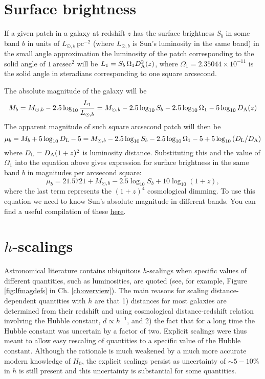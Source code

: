 \section{Surface brightness}
\label{sec:surface_brightness}
If a given patch in a galaxy at redshift $z$ has the surface brightness $S_b$ in some band $b$ in units of $L_{\odot,b}\,\mathrm{pc}^{-2}$ (where $L_{\odot,b}$ is Sun's luminosity in the same band) in the small angle approximation the luminosity of the patch corresponding to the solid angle of $1\ \mathrm{arcsec}^2$ will be $L_1=S_b\,\Omega_1 D_{\rm A}^2(z)$, where $\Omega_1=2.35044\times 10^{-11}$ is the solid angle in steradians corresponding to one square arcsecond. 

The absolute magnitude of the galaxy will be 
\begin{equation}
M_b=M_{\odot,b}-2.5\log_{10}\frac{L_1}{L_{\odot,b}}=M_{\odot,b}-2.5\log_{10}S_b-2.5\log_{10}\Omega_1-5\log_{10}D_{\rm A}(z)
\end{equation}
The apparent magnitude of such square arcsecond patch will then be
\begin{equation}
\mu_b = M_b+5\log_{10}D_{\rm L} - 5=
M_{\odot,b}-2.5\log_{10}S_b-2.5\log_{10}\Omega_1-5+5\log_{10}\left(D_{\rm L}/D_{\rm A}
\right)
\end{equation}
where $D_{\rm L}=D_{\rm A}(1+z)^2$  is luminosity distance. Substituting this and the value of $\Omega_1$ into the equation above gives expression for surface brightness in the same band $b$ in magnitudes per arcsecond square:
\begin{equation}
\mu_b = 21.5721 + M_{\odot,b}-2.5\log_{10}S_b+10\log_{10}(1+z),
\label{eq:musb}
\end{equation}
where the last term represents the $(1+z)^4$ cosmological dimming. To use this equation we need to know Sun's absolute magnitude in different bands. You can find a useful compilation of these \underline{\href{http://www.ucolick.org/~cnaw/sun.html}{here}}.

\section{$h$-scalings}
\label{sec:hscalings}

Astronomical literature contains ubiquitous $h$-scalings when specific values of different quantities, such as luminosities, are quoted (see, for example, Figure \ref{fig:lfmagdefs} in Ch. \ref{ch:overview}). The main reasons for scaling distance-dependent quantities with $h$ are that 1) distances for most galaxies are determined from their redshift and using cosmological distance-redshift relation involving the Hubble constant, $d\propto h^{-1}$, and 2) the fact that for a long time the Hubble constant was uncertain by a factor of two. Explicit scalings were thus meant to allow easy rescaling of quantities to a specific value of the Hubble constant. Although the rationale is much weakened by a much more accurate modern knowledge of $H_0$, the explicit scalings persist as uncertainty of $\sim 5-10\%$ in $h$ is still present and this uncertainty is  substantial for some quantities. 

